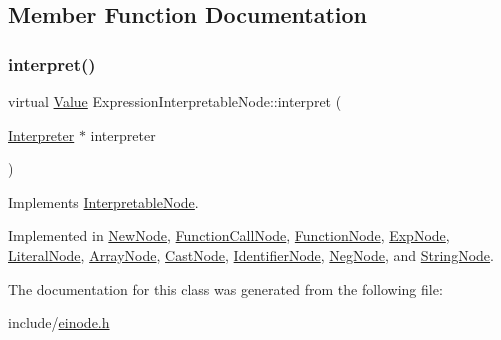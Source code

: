 \subsection{Member Function Documentation}
\mbox{\label{classExpressionInterpretableNode_a43650f046c48fc539f77a207e3c9181e}} 
\subsubsection{\texorpdfstring{interpret()}{interpret()}}
{\footnotesize\ttfamily virtual \hyperlink{classValue}{Value} Expression\+Interpretable\+Node\+::interpret (\begin{DoxyParamCaption}\item[{\hyperlink{classInterpreter}{Interpreter} $\ast$}]{interpreter }\end{DoxyParamCaption})\hspace{0.3cm}{\ttfamily [pure virtual]}}



Implements \hyperlink{classInterpretableNode_a9a466e7d65c4b323d2b96b4ac8396cd7}{Interpretable\+Node}.



Implemented in \hyperlink{classNewNode_a77447b9402f0153401bf0e623b5f1e6e}{New\+Node}, \hyperlink{classFunctionCallNode_a1d0d8806b7dd501ed43da58f77f7c49e}{Function\+Call\+Node}, \hyperlink{classFunctionNode_a059e6682cd51d0e126372a7af257ea5a}{Function\+Node}, \hyperlink{classExpNode_aedff3b19b9e36a77e4558a168b81debf}{Exp\+Node}, \hyperlink{classLiteralNode_abb32ed943c6a5b2029a496ac04885b2a}{Literal\+Node}, \hyperlink{classArrayNode_a029220b946233e22cb661fcfac9634d0}{Array\+Node}, \hyperlink{classCastNode_a2a909a7531791bcbc53c514a01ce5024}{Cast\+Node}, \hyperlink{classIdentifierNode_aa7be7da3e018352f8b549fcac3a8155a}{Identifier\+Node}, \hyperlink{classNegNode_a35ff48d55ab355e27f33dcc21483e4c7}{Neg\+Node}, and \hyperlink{classStringNode_ae92c0858cd07baf0c6417f7bdfce9f0d}{String\+Node}.



The documentation for this class was generated from the following file\+:\begin{DoxyCompactItemize}
\item 
include/\hyperlink{einode_8h}{einode.\+h}\end{DoxyCompactItemize}
